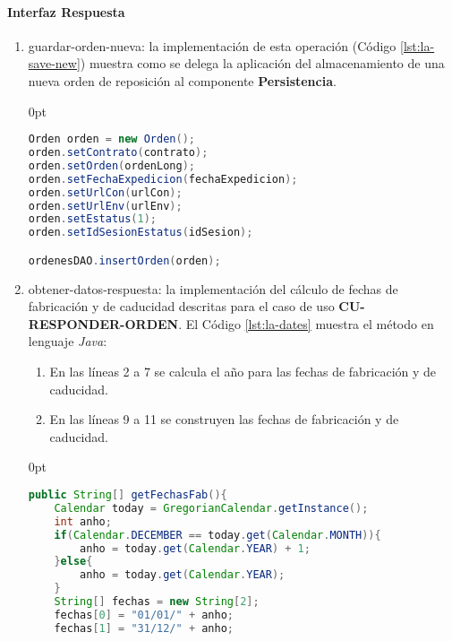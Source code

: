 \paragraph{\indent Interfaz Respuesta}
\begin{enumerate}
	\item guardar-orden-nueva: la implementación de esta operación (Código \ref{lst:la-save-new}) muestra como se delega la aplicación del almacenamiento de una nueva orden de reposición al componente \textbf{Persistencia}.
	\begin{adjustwidth}{\listingfixwidth}{0pt}
	\begin{lstlisting}[language=Java, caption={Delegación del almacenamiento de una nueva orden de reposición.}, captionpos=b, label={lst:la-save-new}]
Orden orden = new Orden();
orden.setContrato(contrato);
orden.setOrden(ordenLong);
orden.setFechaExpedicion(fechaExpedicion);
orden.setUrlCon(urlCon);
orden.setUrlEnv(urlEnv);
orden.setEstatus(1);
orden.setIdSesionEstatus(idSesion);

ordenesDAO.insertOrden(orden);
	\end{lstlisting}
	\end{adjustwidth}
	\item obtener-datos-respuesta: la implementación del cálculo de fechas de fabricación y de caducidad descritas para el caso de uso \textbf{CU-RESPONDER-ORDEN}. El Código \ref{lst:la-dates} muestra el método en lenguaje \textit{Java}:
	\begin{enumerate}
		\item En las líneas 2 a 7 se calcula el año para las fechas de fabricación y de caducidad.
		\item En las líneas 9 a 11 se construyen las fechas de fabricación y de caducidad.
	\end{enumerate}
	\begin{adjustwidth}{\listingfixwidth}{0pt}
	\begin{lstlisting}[language=Java, caption={Método para calcular las fechas de fabricación y caducidad.}, captionpos=b, label={lst:la-dates}]
public String[] getFechasFab(){
	Calendar today = GregorianCalendar.getInstance();
	int anho;
	if(Calendar.DECEMBER == today.get(Calendar.MONTH)){
		anho = today.get(Calendar.YEAR) + 1;
	}else{
		anho = today.get(Calendar.YEAR);
	}
	String[] fechas = new String[2];
	fechas[0] = "01/01/" + anho;
	fechas[1] = "31/12/" + anho;
	

\end{lstlisting}
\end{adjustwidth}
\end{enumerate}
